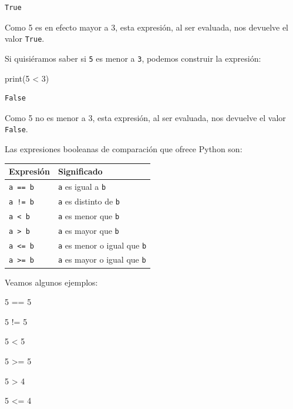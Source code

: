 \documentclass[
  letterpaper,
  DIV=11,
  numbers=noendperiod]{scrreprt}
\newenvironment{Shaded}{\begin{snugshade}}{\end{snugshade}}
\newcommand{\BuiltInTok}[1]{\textcolor[rgb]{0.00,0.23,0.31}{#1}}
\newcommand{\DecValTok}[1]{\textcolor[rgb]{0.68,0.00,0.00}{#1}}
\newcommand{\NormalTok}[1]{\textcolor[rgb]{0.00,0.23,0.31}{#1}}
\newcommand{\OperatorTok}[1]{\textcolor[rgb]{0.37,0.37,0.37}{#1}}
\begin{document}
\begin{verbatim}
True
\end{verbatim}

Como 5 es en efecto mayor a 3, esta expresión, al ser evaluada, nos
devuelve el valor \texttt{True}.

Si quisiéramos saber si \texttt{5} es menor a \texttt{3}, podemos
construir la expresión:

\begin{Shaded}
\begin{Highlighting}[]
\BuiltInTok{print}\NormalTok{(}\DecValTok{5} \OperatorTok{\textless{}} \DecValTok{3}\NormalTok{)}
\end{Highlighting}
\end{Shaded}

\begin{verbatim}
False
\end{verbatim}

Como 5 no es menor a 3, esta expresión, al ser evaluada, nos devuelve el
valor \texttt{False}.

Las expresiones booleanas de comparación que ofrece Python son:

\begin{longtable}[]{@{}ll@{}}
\toprule\noalign{}
Expresión & Significado \\
\midrule\noalign{}
\endhead
\bottomrule\noalign{}
\endlastfoot
\texttt{a\ ==\ b} & \texttt{a} es igual a \texttt{b} \\
\texttt{a\ !=\ b} & \texttt{a} es distinto de \texttt{b} \\
\texttt{a\ \textless{}\ b} & \texttt{a} es menor que \texttt{b} \\
\texttt{a\ \textgreater{}\ b} & \texttt{a} es mayor que \texttt{b} \\
\texttt{a\ \textless{}=\ b} & \texttt{a} es menor o igual que
\texttt{b} \\
\texttt{a\ \textgreater{}=\ b} & \texttt{a} es mayor o igual que
\texttt{b} \\
\end{longtable}

Veamos algunos ejemplos:

\begin{Shaded}
\begin{Highlighting}[]
\DecValTok{5} \OperatorTok{==} \DecValTok{5}

\DecValTok{5} \OperatorTok{!=} \DecValTok{5}

\DecValTok{5} \OperatorTok{\textless{}} \DecValTok{5}

\DecValTok{5} \OperatorTok{\textgreater{}=} \DecValTok{5}

\DecValTok{5} \OperatorTok{\textgreater{}} \DecValTok{4}

\DecValTok{5} \OperatorTok{\textless{}=} \DecValTok{4}
\end{Highlighting}
\end{Shaded}
\end{document}
